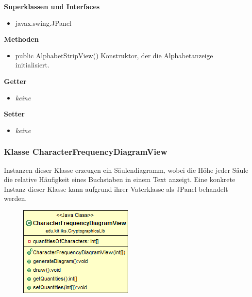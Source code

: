 \documentclass{article}
\begin{document}
      \textbf{Superklassen und Interfaces}
      \begin{itemize}
        \item javax.swing.JPanel
      \end{itemize}
	
      \textbf{Methoden}
      \begin{itemize}
        \item public AlphabetStripView() \newline
          Konstruktor, der die Alphabetanzeige initialisiert.
      \end{itemize}
      
      \textbf{Getter}
      \begin{itemize}
		\item \textit{keine}
      \end{itemize}
      
      \textbf{Setter}
      \begin{itemize}
        \item \textit{keine}
      \end{itemize}
	
	\subsubsection{Klasse CharacterFrequencyDiagramView}
	  Instanzen dieser Klasse erzeugen ein Säulendiagramm, wobei die
	  Höhe jeder Säule die relative Häufigkeit eines Buchstaben in einem Text anzeigt.
	  Eine konkrete Instanz dieser Klasse kann aufgrund ihrer Vaterklasse als JPanel behandelt werden.
	
      \begin{figure}[H]
        \centering
        \includegraphics[width=\textwidth]{resources/edu-kit-iks-CryptographicsLib-CharacterFrequencyDiagramView}
      \end{figure}
	
\end{document}
